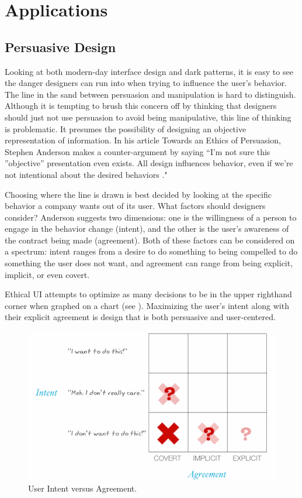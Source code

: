 \documentclass[12pt, oneside]{article}
\begin{document}
\section{Applications}

\subsection{Persuasive Design}

Looking at both modern-day interface design and dark patterns, it is easy to see the danger designers can run into when trying to influence the user's behavior. The line in the sand between persuasion and manipulation is hard to distinguish. Although it is tempting to brush this concern off by thinking that designers should just not use persuasion to avoid being manipulative, this line of thinking is problematic. It presumes the possibility of designing an objective representation of information. In his article Towards an Ethics of Persuasion, Stephen Anderson makes a counter-argument by saying ``I’m not sure this ''objective” presentation even exists. All design influences behavior, even if we’re not intentional about the desired behaviors \cite{anderson_2011}."

Choosing where the line is drawn is best decided by looking at the specific behavior a company wants out of its user. What factors should designers consider? Anderson suggests two dimensions: one is the willingness of a person to engage in the behavior change (intent), and the other is the user's awareness of the contract being made (agreement). Both of these factors can be considered on a spectrum: intent ranges from a desire to do something to being compelled to do something the user does not want, and agreement can range from being explicit, implicit, or even covert.

Ethical UI attempts to optimize as many decisions to be in the upper righthand corner when graphed on a chart (see \cite[Fig. \ref{fig:model}]{anderson_2011}). Maximizing the user's intent along with their explicit agreement is design that is both persuasive and user-centered.

\begin{figure}[ht]
  \includegraphics[width=\linewidth]{Resources/model.jpg}
  \caption{User Intent versus Agreement.}
  \label{fig:model}
\end{figure}
\end{document}
